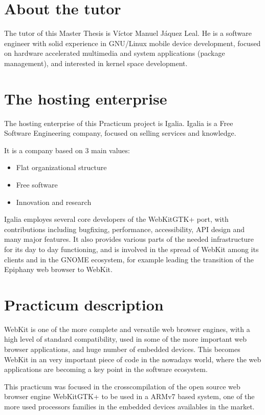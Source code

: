 \documentclass[a4paper,11pt,openany]{report}
\begin{document}
\section{About the tutor}
The tutor of this Master Thesis is V\'ictor Manuel J\'aquez Leal. He is a software engineer with solid experience in GNU/Linux mobile device development, focused on hardware accelerated multimedia and system applications (package management), and interested in kernel space development.

\section{The hosting enterprise}
The hosting enterprise of this Practicum project is Igalia\cite{igalia}. Igalia is a Free Software Engineering company, focused on selling services and knowledge.

It is a company based on 3 main values:

\begin{itemize}
\item Flat organizational structure 
\item Free software
\item Innovation and research
\end{itemize}

Igalia employes several core developers of the WebKitGTK+ port, with contributions including bugfixing, performance, accessibility, API design and many major features. It also provides various parts of the needed infrastructure for its day to day functioning, and is involved in the spread of WebKit among its clients and in the GNOME ecosystem, for example leading the transition of the Epiphany web browser to WebKit.

\section{Practicum description}
WebKit is one of the more complete and versatile web browser engines, with a high level of standard compatibility, used in some of the more important web browser applications, and huge number of embedded devices. This becomes WebKit in an very important piece of code in the nowadays world, where the web applications are becoming a key point in the software ecosystem.

This practicum was focused in the crosscompilation of the open source web browser engine WebKitGTK+ to be used in a ARMv7 based system, one of the more used processors families in the embedded devices availables in the market. 
\end{document}
